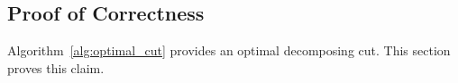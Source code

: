 \documentclass[../main.tex]{subfiles}
\begin{document}
%


\subsection{Proof of Correctness}
\label{sec:proof_of_correctness}

Algorithm~\ref{alg:optimal_cut} provides an optimal decomposing cut. This section proves this claim.
\end{document}
